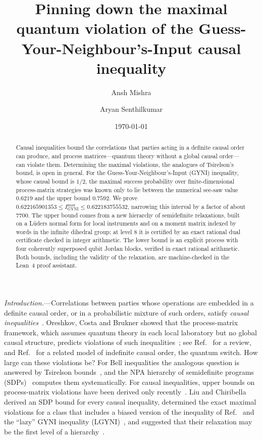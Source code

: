 \documentclass[aps,prl,twocolumn,superscriptaddress,longbibliography,nofootinbib]{revtex4-2}
\newcommand{\Imax}{I_{\mathrm{GYNI}}^{\max}}
\begin{document}
\title{Pinning down the maximal quantum violation of the Guess-Your-Neighbour's-Input causal inequality}

\author{Ansh Mishra}
\author{Aryan Senthilkumar}
\noaffiliation

\date{\today}

\begin{abstract}
Causal inequalities bound the correlations that parties acting in a definite causal order can produce, and process matrices---quantum theory without a global causal order---can violate them. Determining the maximal violations, the analogues of Tsirelson's bound, is open in general. For the Guess-Your-Neighbour's-Input (GYNI) inequality, whose causal bound is $1/2$, the maximal success probability over finite-dimensional process-matrix strategies was known only to lie between the numerical see-saw value $0.6219$ and the upper bound $0.7592$. We prove $0.622165901353\le\Imax\le0.622183755532$, narrowing this interval by a factor of about $7700$. The upper bound comes from a new hierarchy of semidefinite relaxations, built on a L\"uders normal form for local instruments and on a moment matrix indexed by words in the infinite dihedral group; at level 8 it is certified by an exact rational dual certificate checked in integer arithmetic. The lower bound is an explicit process with four coherently superposed qubit Jordan blocks, verified in exact rational arithmetic. Both bounds, including the validity of the relaxation, are machine-checked in the Lean~4 proof assistant.
\end{abstract}

\maketitle

\emph{Introduction.}---Correlations between parties whose operations are embedded in a definite causal order, or in a probabilistic mixture of such orders, satisfy \emph{causal inequalities}~\cite{Oreshkov2012,Branciard2016,OreshkovGiarmatzi2016,Abbott2016}. Oreshkov, Costa and Brukner showed that the process-matrix framework, which assumes quantum theory in each local laboratory but no global causal structure, predicts violations of such inequalities~\cite{Oreshkov2012}; see Ref.~\cite{Costa2026review} for a review, and Ref.~\cite{Chiribella2013} for a related model of indefinite causal order, the quantum switch. How large can these violations be? For Bell inequalities the analogous question is answered by Tsirelson bounds~\cite{Tsirelson1980}, and the NPA hierarchy of semidefinite programs (SDPs)~\cite{NPA2007,NPA2008} computes them systematically. For causal inequalities, upper bounds on process-matrix violations have been derived only recently~\cite{Brukner2015,LiuChiribella2025}. Liu and Chiribella derived an SDP bound for every causal inequality, determined the exact maximal violations for a class that includes a biased version of the inequality of Ref.~\cite{Oreshkov2012} and the ``lazy'' GYNI inequality (LGYNI)~\cite{Branciard2016}, and suggested that their relaxation may be the first level of a hierarchy~\cite{LiuChiribella2025}.
\end{document}
